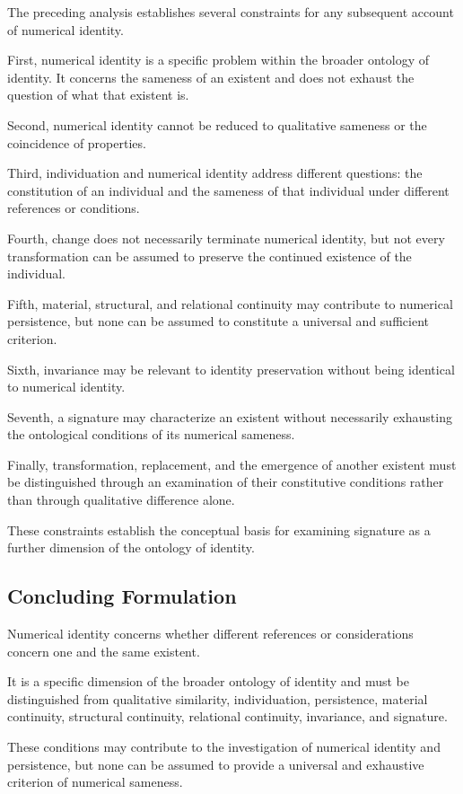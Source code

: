 The preceding analysis establishes
several constraints for any subsequent
account of numerical identity.

First, numerical identity is a specific
problem within the broader ontology
of identity. It concerns the sameness
of an existent and does not exhaust
the question of what that existent is.

Second, numerical identity cannot
be reduced to qualitative sameness
or the coincidence of properties.

Third, individuation and numerical
identity address different questions:
the constitution of an individual
and the sameness of that individual
under different references or conditions.

Fourth, change does not necessarily
terminate numerical identity, but
not every transformation can be assumed
to preserve the continued existence
of the individual.

Fifth, material, structural, and
relational continuity may contribute
to numerical persistence, but none
can be assumed to constitute a universal
and sufficient criterion.

Sixth, invariance may be relevant
to identity preservation without being
identical to numerical identity.

Seventh, a signature may characterize
an existent without necessarily exhausting
the ontological conditions of its
numerical sameness.

Finally, transformation, replacement,
and the emergence of another existent
must be distinguished through an
examination of their constitutive
conditions rather than through qualitative
difference alone.

These constraints establish the
conceptual basis for examining signature
as a further dimension of the ontology
of identity.

\subsection{Concluding Formulation}

Numerical identity concerns whether
different references or considerations
concern one and the same existent.

It is a specific dimension of the
broader ontology of identity and must
be distinguished from qualitative
similarity, individuation, persistence,
material continuity, structural
continuity, relational continuity,
invariance, and signature.

These conditions may contribute to
the investigation of numerical identity
and persistence, but none can be
assumed to provide a universal and
exhaustive criterion of numerical
sameness.

